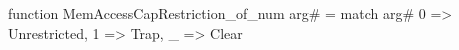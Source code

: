 function MemAccessCapRestriction_of_num arg# = match arg# {
  0 => Unrestricted,
  1 => Trap,
  _ => Clear
}
